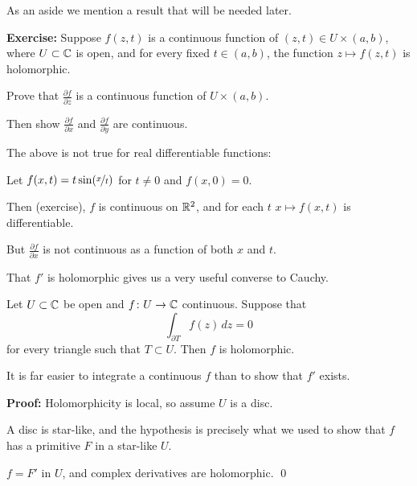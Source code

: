 \documentclass[10pt,aspectratio=169]{beamer}
\begin{document}
\begin{frame}

As an aside we mention a result that will be needed later.

\medskip
\pause

\textbf{Exercise:}
Suppose $f(z,t)$ is a continuous function of $(z,t) \in U \times (a,b)$,
where $U \subset {\mathbb{C}}$ is open, and for every fixed $t \in (a,b)$, the function
$z \mapsto f(z,t)$ is holomorphic.

\pause

Prove that
$\frac{\partial f}{\partial z}$ is a continuous function of $U \times
(a,b)$.

\pause

Then show
$\frac{\partial f}{\partial x}$
and
$\frac{\partial f}{\partial y}$ are continuous.

\medskip
\pause

The above is not true for real differentiable functions:

\medskip
\pause

Let $f(x,t) = t \sin(\nicefrac{x}{t})$ for $t \not= 0$ and $f(x,0) =  0$.

\medskip
\pause

Then (exercise), $f$ is continuous on ${\mathbb{R}}^2$, and for each $t$
$x \mapsto f(x,t)$ is differentiable.

\medskip
\pause

But $\frac{\partial f}{\partial x}$ is not continuous as a function of both
$x$ and $t$.
\end{frame}

\begin{frame}
That $f'$ is holomorphic gives us a very useful converse to Cauchy.

\pause

\begin{theorem}[Morera]
Let $U \subset {\mathbb{C}}$ be open and $f \colon U \to {\mathbb{C}}$ continuous.
Suppose that
\[
\int_{\partial T} f(z) \, dz = 0
\]
for every triangle such that $T \subset U$.
\pause
Then $f$ is holomorphic.
\end{theorem}

\pause

It is far easier to integrate a continuous $f$ than to show that $f'$ exists.

\medskip
\pause

\textbf{Proof:}
Holomorphicity is local, so assume $U$ is a disc.

\medskip
\pause

A disc is star-like, and the hypothesis is precisely what we used
to show that $f$ has a primitive $F$ in a star-like $U$.

\medskip
\pause

$f = F'$ in $U$, and complex derivatives are holomorphic.
\qed

\end{frame}
\end{document}
